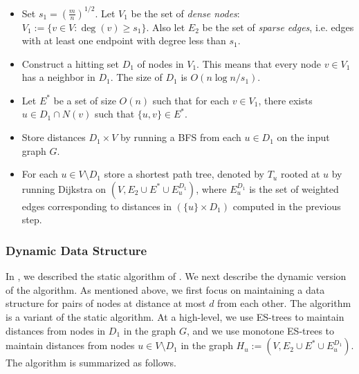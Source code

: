 \documentclass[11pt]{article}
\theoremstyle{definition}
\theoremstyle{remark}
\begin{document}
\begin{titlepage}
{\begin{itemize}
    \item Set $s_1= (\frac{m}{n})^{1/2}$. Let $V_1$ be the set of \textit{dense nodes}: $V_1:= \{ v \in V: \deg(v) \geq s_1\}$. Also let $E_2$ be the set of \textit{sparse edges}, i.e. edges with at least one endpoint with degree less than $s_1$.
    \item Construct a hitting set $D_1$ of nodes in $V_1$. %
    This means that every node $v \in V_1$ has a neighbor in $D_1$. The size of $D_1$ is $O(n \log{n}/s_1)$.
    \item Let $E^*$ be a set of size $O(n)$ such that for each $v \in V_1$, there exists $u \in D_1 \cap N(v)$ such that $\{u,v\} \in E^*$. 
    \item Store distances $D_1 \times V$ by running a BFS from each $u \in D_1$ on the input graph $G$. 
    \item For each $u \in V \setminus D_1$ store a shortest path tree, denoted by $T_u$  rooted at $u$ by running Dijkstra on $(V, E_2 \cup E^* \cup E^{D_1}_u)$, where $E^{D_1}_u$ is the set of weighted edges corresponding to distances in $(\{u\} \times D_1)$ computed in the previous step. 
\end{itemize}
}

\subsubsection{Dynamic Data Structure} 
In , we described the static algorithm of \cite{DHZ00}. We next describe the dynamic version of the algorithm. As mentioned above, we first focus on maintaining a data structure for pairs of nodes at distance at most $d$ from each other. The algorithm is a variant of the static algorithm. At a high-level, we use ES-trees to maintain distances from nodes in $D_1$ in the graph $G$, and we use monotone ES-trees to maintain distances from nodes $u \in V \setminus D_1$ in the graph $H_u:=(V, E_2 \cup E^* \cup E^{D_1}_u)$. 
The algorithm is summarized as follows.


\end{titlepage}
\end{document}
